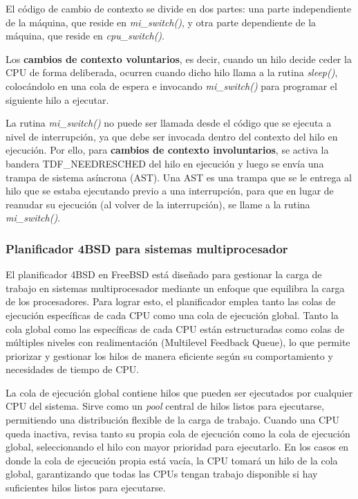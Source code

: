 El código de cambio de contexto se divide en dos partes: una parte independiente de la máquina, que reside en \textit{mi\_switch()}, y otra parte dependiente de la máquina, que reside en \textit{cpu\_switch()}.\par

Los \textbf{cambios de contexto voluntarios}, es decir, cuando un hilo decide ceder la CPU de forma deliberada, ocurren cuando dicho hilo llama a la rutina \textit{sleep()}, colocándolo en una cola de espera e invocando \textit{mi\_switch()} para programar el siguiente hilo a ejecutar.\par

La rutina \textit{mi\_switch()} no puede ser llamada desde el código que se ejecuta a nivel de interrupción, ya que debe ser invocada dentro del contexto del hilo en ejecución. Por ello, para \textbf{cambios de contexto involuntarios}, se activa la bandera TDF\_NEEDRESCHED del hilo en ejecución y luego se envía una trampa de sistema asíncrona (AST). Una AST es una trampa que se le entrega al hilo que se estaba ejecutando previo a una interrupción, para que en lugar de reanudar su ejecución (al volver de la interrupción), se llame a la rutina \textit{mi\_switch()}.\par

\subsubsection{Planificador 4BSD para sistemas multiprocesador}

El planificador 4BSD en FreeBSD está diseñado para gestionar la carga de trabajo en sistemas multiprocesador mediante un enfoque que equilibra la carga de los procesadores. Para lograr esto, el planificador emplea tanto las colas de ejecución específicas de cada CPU como una cola de ejecución global. Tanto la cola global como las específicas de cada CPU están estructuradas como colas de múltiples niveles con realimentación (Multilevel Feedback Queue), lo que permite priorizar y gestionar los hilos de manera eficiente según su comportamiento y necesidades de tiempo de CPU.

La cola de ejecución global contiene hilos que pueden ser ejecutados por cualquier CPU del sistema. Sirve como un \textit{pool} central de hilos listos para ejecutarse, permitiendo una distribución flexible de la carga de trabajo. Cuando una CPU queda inactiva, revisa tanto su propia cola de ejecución como la cola de ejecución global, seleccionando el hilo con mayor prioridad para ejecutarlo. En los casos en donde la cola de ejecución propia está vacía, la CPU tomará un hilo de la cola global, garantizando que todas las CPUs tengan trabajo disponible si hay suficientes hilos listos para ejecutarse.

